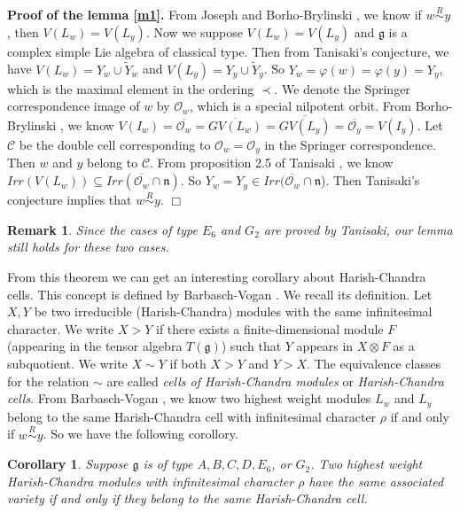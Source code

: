 \documentclass{amsart}[12pt]
\newtheorem{Cor}{Corollary}[section]
\newtheorem{Rem}{Remark}[section]
\renewcommand{\subset}{\subseteq}
\numberwithin{equation}{section}
\begin{document}
{\bf Proof of the lemma \ref{m1}.}
From Joseph \cite{Jo84} and Borho-Brylinski \cite{BoB3}, we know if $w\stackrel{R}{\sim} y$, then $V(L_w)=V(L_y)$. Now we suppose $V(L_w)=V(L_y)$ and  $\mathfrak{g}$ is a complex simple Lie algebra of classical type. Then from Tanisaki's conjecture, we have $V(L_w)=Y_w \cup \widetilde{Y}_w$ and $V(L_y)=Y_y \cup \widetilde{Y}_y$.  So $Y_w=\varphi(w)=\varphi(y)=Y_y$, which is the maximal element in the ordering $\prec$. We denote the Springer correspondence image of $w$ by $\mathcal{O}_w $, which is a special nilpotent orbit. From Borho-Brylinski \cite{BoB1}, we know $V(I_w)=\overline{\mathcal{O}_w}=\overline{GV(L_w)}=\overline{GV(L_y)}=\overline{\mathcal{O}_y}=V(I_y)$.  Let $\mathscr{C} $ be the double cell corresponding to $\mathcal{O}_w=\mathcal{O}_y$ in the Springer correspondence. Then $w$ and $y$ belong to $\mathscr{C} $.
From proposition 2.5 of Tanisaki \cite{Ta}, we know $Irr(V(L_w))\subset Irr(\overline{\mathcal{O}_w}\cap \mathfrak{n})$. So $Y_w=Y_y \in Irr(\overline{\mathcal{O}_w}\cap \mathfrak{n}$).
Then Tanisaki's conjecture implies that $w\stackrel{R}{\sim} y$.  \quad  \quad \quad \quad \quad \quad \quad \quad \quad \quad\quad \quad \quad \quad \quad \quad \quad \quad \quad \quad \quad \quad \quad $\Box$

%
\begin{Rem}\label{EG} Since the cases of type $E_6$ and $G_2$ are proved by Tanisaki, our lemma still holds for these two cases.

\end{Rem}

From this theorem we can get an interesting corollary about Harish-Chandra cells. This concept is defined by Barbasch-Vogan \cite{BV83}.   We recall its definition.
Let $X,Y$ be two irreducible (Harish-Chandra) modules with the same infinitesimal character. We write $X>Y$ if there exists a finite-dimensional module $F$ (appearing in the tensor algebra $T(\mathfrak{g})$) such that $Y$ appears in $X\otimes F$ as a subquotient. We write $X\sim Y$ if both $X>Y$ and $Y>X$. The equivalence classes for the relation $\sim$ are called {\it cells of Harish-Chandra modules} or {\it Harish-Chandra cells}.
From Barbasch-Vogan \cite{BV}, we know two highest weight modules $L_w$ and $L_y$ belong to the same Harish-Chandra cell with infinitesimal character $\rho$ if and only if  $w\stackrel{R}{\sim} y$. So we have the following corollory.

\begin{Cor} Suppose $\mathfrak{g}$ is of type $A, B, C, D, E_6$, or $ G_2$.  Two highest weight Harish-Chandra modules with infinitesimal character $\rho$ have the same associated variety if and only if they belong to the same Harish-Chandra cell.

\end{Cor}
\end{document}
